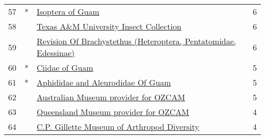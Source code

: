 \begin{longtable}{llp{5in}r}
57 &  * &                                                                                                                                                                                 \href{https://www.gbif.org/dataset/9b2056ec-f71b-4ff8-b642-e7aed6aa0eeb}{Isoptera of Guam} &             6 \\
58 &    &                                                                                                                                                           \href{https://www.gbif.org/dataset/96193ea2-f762-11e1-a439-00145eb45e9a}{Texas A\&M University Insect Collection} &             6 \\
59 &    &                                                                                                                                 \href{https://www.gbif.org/dataset/32bd22ce-7d3f-4eac-8203-e9f61a19c7f0}{Revision Of Brachystethus (Heteroptera, Pentatomidae, Edessinae)} &             6 \\
60 &  * &                                                                                                                                                                                   \href{https://www.gbif.org/dataset/cadac5b6-f94f-4a2c-bf21-9e41c1f153fc}{Ciidae of Guam} &             5 \\
61 &  * &                                                                                                                                                                \href{https://www.gbif.org/dataset/4b8ded0c-2d13-4692-88bc-11c60ca8c8dd}{Aphididae and Aleurodidae Of Guam} &             5 \\
62 &    &                                                                                                                                                             \href{https://www.gbif.org/dataset/dce8feb0-6c89-11de-8225-b8a03c50a862}{Australian Museum provider for OZCAM} &             5 \\
63 &    &                                                                                                                                                             \href{https://www.gbif.org/dataset/a79c2b50-6c8a-11de-8226-b8a03c50a862}{Queensland Museum provider for OZCAM} &             4 \\
64 &    &                                                                                                                                                      \href{https://www.gbif.org/dataset/323b0e80-5e4b-4cc4-936a-d93fc8cae9bc}{C.P. Gillette Museum of Arthropod Diversity} &             4 \\

\end{longtable}
